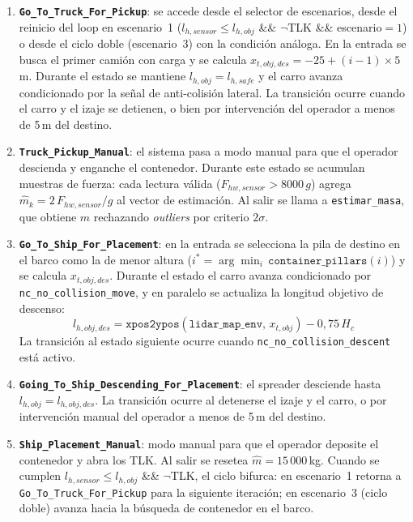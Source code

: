 \documentclass[12pt, a4paper]{article}
\begin{document}
\begin{enumerate}\sloppy
    \item \textbf{\texttt{Go\_To\_Truck\_For\_Pickup}}: se accede desde el selector
    de escenarios, desde el reinicio del loop en escenario~1
    ($l_{h,sensor} \leq l_{h,obj}$ \&\& $\lnot$TLK \&\& escenario$=1$) o desde el
    ciclo doble (escenario~3) con la condición análoga. En la entrada se busca el
    primer camión con carga y se calcula $x_{t,obj,des} = -25 + (i-1)\times 5$\,m.
    Durante el estado se mantiene $l_{h,obj} = l_{h,safe}$ y el carro avanza
    condicionado por la señal de anti-colisión lateral. La transición ocurre cuando
    el carro y el izaje se detienen, o bien por intervención del operador a menos de
    5\,m del destino.

    \item \textbf{\texttt{Truck\_Pickup\_Manual}}: el sistema pasa a modo manual para
    que el operador descienda y enganche el contenedor. Durante este estado se acumulan
    muestras de fuerza: cada lectura válida ($F_{hw,sensor} > 8000\,g$) agrega
    $\hat{m}_k = 2\,F_{hw,sensor}/g$ al vector de estimación. Al salir se llama a
    \texttt{estimar\_masa}, que obtiene $\hat{m}$ rechazando \textit{outliers} por
    criterio $2\sigma$.

    \item \textbf{\texttt{Go\_To\_Ship\_For\_Placement}}: en la entrada se selecciona la
    pila de destino en el barco como la de menor altura
    ($i^* = \arg\min_i\,\mathtt{container\_pillars}(i)$) y se calcula $x_{t,obj,des}$.
    Durante el estado el carro avanza condicionado por \texttt{nc\_no\_collision\_move},
    y en paralelo se actualiza la longitud objetivo de descenso:
    \[
        l_{h,obj,des} = \mathtt{xpos2ypos}(\mathtt{lidar\_map\_env},\,x_{t,obj})
                        - 0{,}75\,H_c
    \]
    La transición al estado siguiente ocurre cuando \texttt{nc\_no\_collision\_descent}
    está activo.

    \item \textbf{\texttt{Going\_To\_Ship\_Descending\_\allowbreak For\_Placement}}:
    el spreader desciende hasta $l_{h,obj} = l_{h,obj,des}$. La transición ocurre al
    detenerse el izaje y el carro, o por intervención manual del operador a menos de
    5\,m del destino.

    \item \textbf{\texttt{Ship\_Placement\_Manual}}: modo manual para que el operador
    deposite el contenedor y abra los TLK. Al salir se resetea $\hat{m} = 15\,000$\,kg.
    Cuando se cumplen $l_{h,sensor} \leq l_{h,obj}$ \&\& $\lnot$TLK, el ciclo
    bifurca: en escenario~1 retorna a \texttt{Go\_To\_Truck\_For\_Pickup} para la
    siguiente iteración; en escenario~3 (ciclo doble) avanza hacia la búsqueda de
    contenedor en el barco.
\end{enumerate}
\end{document}
